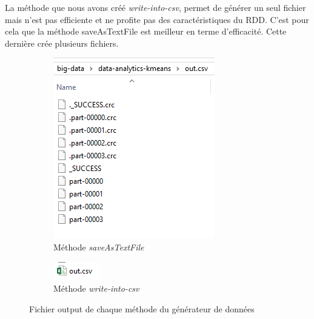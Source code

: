\documentclass[french]{article}
\begin{document}
La méthode que nous avons créé \textit{write-into-csv}, permet de générer un seul fichier mais n'est pas efficiente et ne profite pas des caractéristiques du RDD. C'est pour cela  que la méthode saveAsTextFile est meilleur en terme d'efficacité. Cette dernière crée plusieurs fichiers.

\begin{figure}[h!]
\centering
\begin{subfigure}{.5\textwidth}
  \centering
  \includegraphics[width=.4\linewidth]{img/save-text-file.png}
  \caption{Méthode \textit{saveAsTextFile}}
  \label{fig:sub1}
\end{subfigure}%
\begin{subfigure}{.5\textwidth}
  \centering
  \includegraphics[width=.4\linewidth]{img/write-into-csv.png}
  \caption{Méthode \textit{write-into-csv}}
  \label{fig:sub2}
\end{subfigure}
\caption{Fichier output de chaque méthode du générateur de données}
\label{fig:test}
\end{figure}
\end{document}
